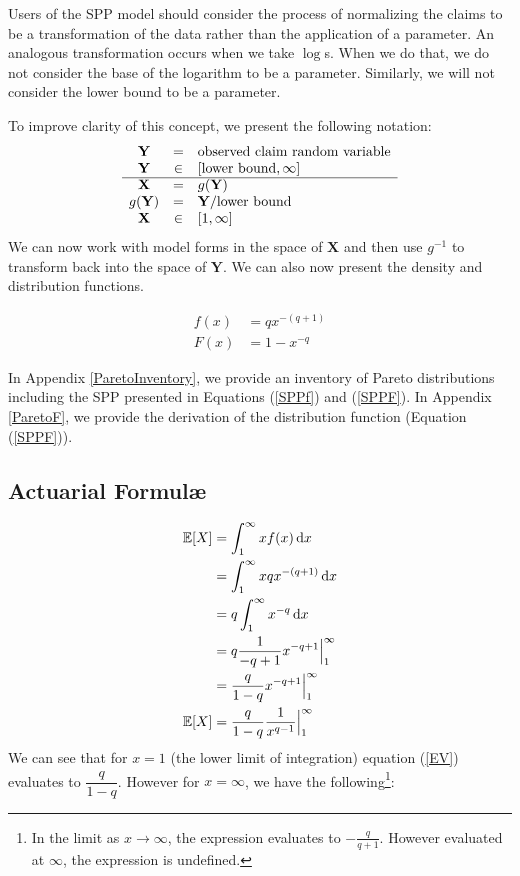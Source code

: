 \documentclass[]{article} %
\begin{document}
Users of the SPP model should consider the process of normalizing the claims to be a transformation of the data rather than the application of a parameter. An analogous transformation occurs when we take $\log$s. When we do that, we do not consider the base of the logarithm to be a parameter. Similarly, we will not consider the lower bound to be a parameter.

To improve clarity of this concept, we present the following notation:
\begin{eqnarray}
	\begin{array}{ccl}
		\mathbf{Y} & = & \text{observed claim random variable} \\ 
		\mathbf{Y}& \in &  [\text{lower bound}, \infty]\\
		\cline{1-3}
		\mathbf{X} & =  & g(\mathbf{Y})\\
		g(\mathbf{Y}) & =  & \mathbf{Y}/\text{lower bound}\\
		\mathbf{X}& \in &  [1, \infty]\\
	\end{array} 
\end{eqnarray}
We can now work with model forms in the space of $\mathbf{X}$ and then use $g^{-1}$ to transform back into the space of $\mathbf{Y}$. We can also now present the density and distribution functions.

\begin{align}
		f(x) & =  qx^{-(q+1)}\label{SPPf}\\
		F(x) & =  1 - x^{-q}\label{SPPF}
\end{align}

In Appendix \ref{ParetoInventory}, we provide an inventory of Pareto distributions including the SPP presented in Equations (\ref{SPPf}) and (\ref{SPPF}). In  Appendix \ref{ParetoF}, we provide the derivation of the distribution function (Equation (\ref{SPPF})).

\subsection{Actuarial Formul\ae}
\begin{align}
	\mathbb{E}[X] & = \int_{1}^{\infty}x f(x) \operatorname{d \!} x \nonumber\\
		& = \int_{1}^{\infty}xqx^{-(q+1)} \operatorname{d \!} x\nonumber\\
		& = q \int_{1}^{\infty}x^{-q} \operatorname{d \!} x\nonumber\\
		& = q \frac{1}{-q+1} x^{-q+1} \Big|_{1}^{\infty}\nonumber\\
		& = \frac{q}{1-q} x^{-q+1} \Big|_{1}^{\infty}\nonumber\\
	\mathbb{E}[X] 	& = \frac{q}{1-q} \dfrac{1}{x^{q-1}} \Big|_{1}^{\infty}\label{EV}
\end{align}
We can see that for $x = 1$ (the lower limit of integration) equation (\ref{EV}) evaluates to $\dfrac{q}{1-q}$. However for $x = \infty$, we have the following\footnote{In the limit as $x\to\infty$, the expression evaluates to  $-\frac{q}{q+1}$. However evaluated at $\infty$, the expression is undefined.}:
\end{document}
